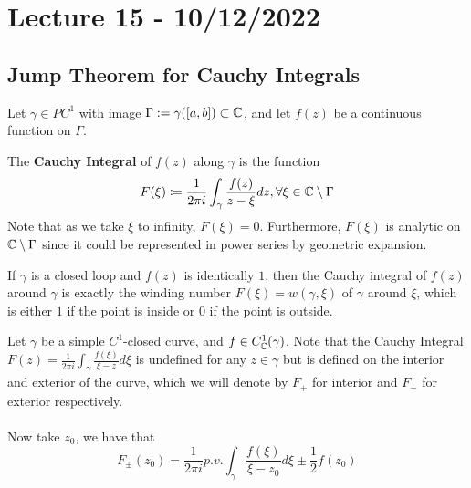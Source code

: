 \section{Lecture 15 - 10/12/2022}

\subsection{Jump Theorem for Cauchy Integrals}
Let $\gamma \in PC^1$ with image $\Gamma := \gamma([a, b]) \subset \mathbb{C}$, and let $f(z)$ be a continuous function on $\Gamma$.

\begin{definition}
The \textbf{Cauchy Integral} of $f(z)$ along $\gamma$ is the function
\[F(\xi) \coloneqq \frac{1}{2\pi i} \int_\gamma \frac{f(z)}{z - \xi} dz, \forall \xi \in \mathbb{C} \setminus \Gamma\]
Note that as we take $\xi$ to infinity, $F(\xi) = 0$. Furthermore, $F(\xi)$ is analytic on $\mathbb{C} \setminus \Gamma$ since it could be represented in power series by geometric expansion.
\end{definition}

\begin{example}
If $\gamma$ is a closed loop and $f(z)$ is identically $1$, then the Cauchy integral of $f(z)$ around $\gamma$ is exactly the winding number $F(\xi) = w(\gamma, \xi)$ of $\gamma$ around $\xi$, which is either $1$ if the point is inside or $0$ if the point is outside.
\end{example}

\begin{theorem}
Let $\gamma$ be a simple $C^1$-closed curve, and $f \in C^1_{\mathbb{C}}(\gamma)$. Note that the Cauchy Integral $F(z) = \frac{1}{2\pi i} \int_\gamma \frac{f(\xi)}{\xi - z} d\xi$ is undefined for any $z \in \gamma$ but is defined on the interior and exterior of the curve, which we will denote by $F_+$ for interior and $F_-$ for exterior respectively.\\\\
Now take $z_0$, we have that
\[F_{\pm}(z_0) = \frac{1}{2\pi i} p.v. \int_\gamma \frac{f(\xi)}{\xi - z_0} d\xi \pm \frac{1}{2} f(z_0)\]
\end{theorem}

